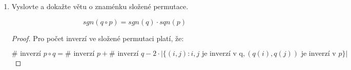 \documentclass[10pt,a4paper]{article}
\begin{document}
\begin{enumerate}
\begin{proof}
\begin{itemize}
\item $2 \iff 4$: Z věty o řešení homogenních soustav 5.: 
\begin{equation*}
rank(A) = n \iff A^\prime \sim A \text{ neobsahuje volné proměnné } \iff  \text{ existuje právě jedno řešení }
\end{equation*}
\item $2 \implies 3$:
Provedeme Gaussovu eliminaci a potom eliminujeme prvky nad pivoty.
\item $3 \implies 2$: triviální.

\item $1 \iff 2$: \begin{itemize}

\item $2 \implies 1$

Označme $e_1 ... e_n$ sloupce matice $I_n$ a uvažme $n$ soustav pro $Ax^i = e^i$ pro $i = 1 ... n$

$rank(A) = n \implies$ tyto soustavy mají řešení $\implies A^{-1} = (x_1, ..., x_n)$

\item $1 \implies 2$

Sporem. Kdyby $rank(A) < n \implies$ nějaký i-tý řádek lze eliminovat ostatními $\implies$ soustava $Ax_i = e_i$ nemá řešení, protože 1 na i-tém řádku v $e_i$ nelze eliminovat nulami. ... spor s existencí $A^{-1}$.

\end{itemize}

\end{itemize}
\end{proof}

\item Vyslovte a dokažte větu o znaménku složené permutace.

\begin{equation*}
sgn(q \circ p) = sgn(q) \cdot sqn(p)
\end{equation*}

\begin{proof} 
Pro počet inverzí ve složené permutaci platí, že:

\begin{equation*}
\# \text{ inverzí } p \circ q = \# \text{ inverzí } p + \# \text{ inverzí } q - 2 \cdot |\{(i,j): i, j \text{ je inverzí v q}, (q(i), q(j)) \text{ je inverzí v } p \}| 
\end{equation*}


\end{proof}
\end{enumerate}
\end{document}
